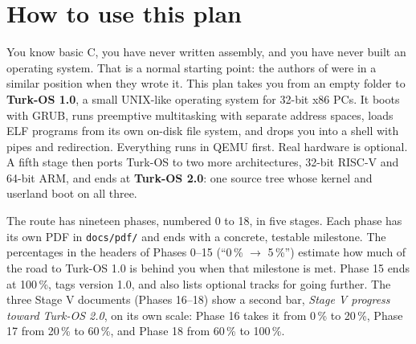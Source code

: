 \documentclass[11pt,a4paper]{article}
\begin{document}
\thispagestyle{plain}

\noindent{}

\vspace{0.4em}
\noindent{}

\tableofcontents

\section{How to use this plan}

You know basic C, you have never written assembly, and you have never built an operating system. That is a normal
starting point: the authors of \LOB were in a similar position when they wrote it. This plan takes you from an empty
folder to \textbf{Turk-OS 1.0}, a small UNIX-like operating system for 32-bit x86 PCs. It boots with GRUB, runs
preemptive multitasking with separate address spaces, loads ELF programs from its own on-disk file system, and drops
you into a shell with pipes and redirection. Everything runs in QEMU first. Real hardware is optional.
A fifth stage then ports Turk-OS to two more architectures, 32-bit RISC-V and 64-bit ARM, and ends at
\textbf{Turk-OS 2.0}: one source tree whose kernel and userland boot on all three.

The route has nineteen phases, numbered 0 to 18, in five stages. Each phase has its own PDF in \texttt{docs/pdf/}
and ends with a concrete, testable milestone. The percentages in the headers of Phases 0--15 (``0\,\% $\rightarrow$
5\,\%'') estimate how much of the road to Turk-OS 1.0 is behind you when that milestone is met. Phase 15 ends at
100\,\%, tags version 1.0, and also lists optional tracks for going further. The three Stage V documents (Phases
16--18) show a second bar, \emph{Stage V progress toward Turk-OS 2.0}, on its own scale: Phase 16 takes it from
0\,\% to 20\,\%, Phase 17 from 20\,\% to 60\,\%, and Phase 18 from 60\,\% to 100\,\%.
\end{document}
